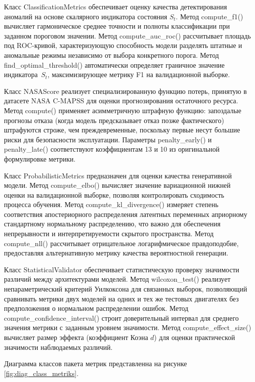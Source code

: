 \documentclass[14pt, a4paper, oneside]{extreport}
\begin{document}
Класс {ClassificationMetrics} обеспечивает оценку качества детектирования аномалий на основе скалярного индикатора состояния $S_t$. Метод {compute\_f1()} вычисляет гармоническое среднее точности и полноты классификации при заданном пороговом значении. Метод {compute\_auc\_roc()} рассчитывает площадь под ROC-кривой, характеризующую способность модели разделять штатные и аномальные режимы независимо от выбора конкретного порога. Метод {find\_optimal\_threshold()} автоматически определяет граничное значение индикатора~$S_t$, максимизирующее метрику F1 на валидационной выборке.

Класс {NASAScore} реализует специализированную функцию потерь, принятую в датасете NASA C-MAPSS для оценки прогнозирования остаточного ресурса. Метод {compute()} применяет асимметричную штрафную функцию: запоздалые прогнозы отказа (когда модель предсказывает отказ позже фактического) штрафуются строже, чем преждевременные, поскольку первые несут большие риски для безопасности эксплуатации. Параметры {penalty\_early()} и {penalty\_late()} соответствуют коэффициентам 13 и 10 из оригинальной формулировке метрики.

Класс {ProbabilisticMetrics} предназначен для оценки качества генеративной модели. Метод {compute\_elbo()} вычисляет значение вариационной нижней оценки на валидационной выборке, позволяя контролировать сходимость процесса обучения. Метод {compute\_kl\_divergence()} измеряет степень соответствия апостериорного распределения латентных переменных априорному стандартному нормальному распределению, что важно для обеспечения непрерывности и интерпретируемости скрытого пространства. Метод {compute\_nll()} рассчитывает отрицательное логарифмическое правдоподобие, предоставляя альтернативную метрику качества вероятностной генерации.

Класс {StatisticalValidator} обеспечивает статистическую проверку значимости различий между архитектурами моделей. Метод {wilcoxon\_test()} реализует непараметрический критерий Уилкоксона для связанных выборок, позволяющий сравнивать метрики двух моделей на одних и тех же тестовых двигателях без предположения о нормальном распределении ошибок. Метод {compute\_confidence\_interval()} строит доверительный интервал для среднего значения метрики с заданным уровнем значимости. Метод {compute\_effect\_size()} вычисляет размер эффекта (коэффициент Коэна $d$) для оценки практической значимости наблюдаемых различий.

Диаграмма классов пакета метрик представленна на рисунке \ref{fig:diag_class_metriks}.
\end{document}
